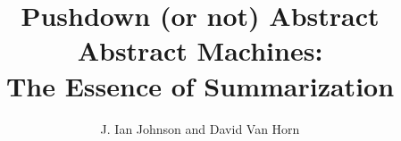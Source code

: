 \documentclass[article]{llncs}
\begin{document}
\title{Pushdown (or not) Abstract Abstract Machines:\\The Essence of Summarization}
\author{J. Ian Johnson and David Van Horn}


\maketitle

\begin{abstract}

\end{abstract}







\end{document}
